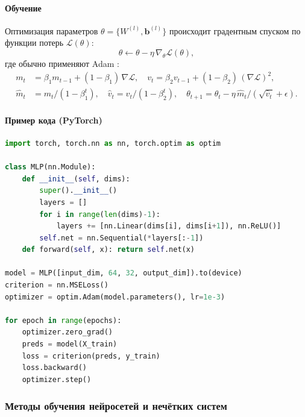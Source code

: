 \paragraph{Обучение}
Оптимизация параметров $\theta=\{W^{(l)},\mathbf{b}^{(l)}\}$ происходит
градентным спуском по функции потерь $\mathcal{L}(\theta)$:
\begin{equation}
  \theta \leftarrow \theta - \eta\,\nabla_\theta \mathcal{L}(\theta),
  \label{eq:gd_full}
\end{equation}
где обычно применяют Adam \cite{Kingma2015}:
\begin{align}
  m_t &= \beta_1 m_{t-1} + (1-\beta_1)\,\nabla\mathcal{L},\quad
  v_t = \beta_2 v_{t-1} + (1-\beta_2)\,(\nabla\mathcal{L})^2, \nonumber\\
  \hat m_t &= m_t/(1-\beta_1^t),\quad
  \hat v_t = v_t/(1-\beta_2^t),\quad
  \theta_{t+1} = \theta_t - \eta\,\hat m_t/(\sqrt{\hat v_t}+\epsilon).
  \label{eq:adam_full}
\end{align}

\paragraph{Пример кода (PyTorch)}
\begin{lstlisting}[language=Python, caption={Простейший цикл обучения MLP на PyTorch}, label={lst:nn_training}]
import torch, torch.nn as nn, torch.optim as optim

class MLP(nn.Module):
    def __init__(self, dims):
        super().__init__()
        layers = []
        for i in range(len(dims)-1):
            layers += [nn.Linear(dims[i], dims[i+1]), nn.ReLU()]
        self.net = nn.Sequential(*layers[:-1])
    def forward(self, x): return self.net(x)

model = MLP([input_dim, 64, 32, output_dim]).to(device)
criterion = nn.MSELoss()
optimizer = optim.Adam(model.parameters(), lr=1e-3)

for epoch in range(epochs):
    optimizer.zero_grad()
    preds = model(X_train)
    loss = criterion(preds, y_train)
    loss.backward()
    optimizer.step()
\end{lstlisting}

\subsubsection{Методы обучения нейросетей и нечётких систем}
\label{subsec:training_methods}

